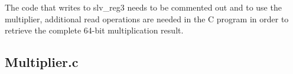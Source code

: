 \documentclass[11pt,letterpaper,titlepage]{article}
\begin{document}
The code that writes to slv\_reg3 needs to be commented out and to use the multiplier, additional read operations are needed in the C program in order to retrieve the complete 64-bit multiplication result.


\newpage

\begin{appendices}

\section{Multiplier.c}
\label{appendix:multiplier_c}


\end{appendices}
\end{document}
